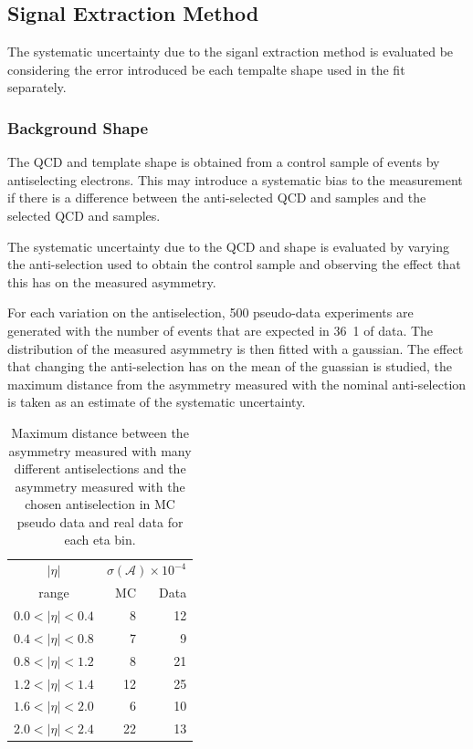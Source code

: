 \subsection{Signal Extraction Method}

The systematic uncertainty due to the siganl extraction method is evaluated be
considering the error introduced be each \ETm tempalte shape used in the fit
separately.

\subsubsection{Background \ETm Shape}

The \ac{QCD} and \gjet \ETm template shape is obtained from a control sample of
events by antiselecting electrons. This may introduce a systematic bias to the
measurement if there is a difference between the anti-selected \ac{QCD} and \gjet
\ETm samples and the selected \ac{QCD} and \gjet samples.

The systematic uncertainty due to the \ac{QCD} and \gjet \ETm shape is evaluated by
varying the anti-selection used to obtain the control sample and observing the
effect that this has on the measured asymmetry.

For each variation on the antiselection, 500 pseudo-data experiments are
generated with the number of events that are expected in \unit{36.1}{\invpb} of
data. The distribution of the measured asymmetry is then fitted with a
gaussian.
The effect that changing the anti-selection has on the mean of the guassian is
studied, the maximum distance from the asymmetry measured with the nominal
anti-selection is taken as an estimate of the systematic uncertainty.

\begin{table}[htbp]
\begin{center}
\begin{tabular}{crr}
    \toprule
$|\eta|$  &\multicolumn{2}{c}{ $\sigma(\mathcal{A}) \times 10^{-4}$}\\
   range      & MC & Data\\
\midrule
$0.0<|\eta|<0.4$ & 8 & 12\\
$0.4<|\eta|<0.8$ & 7 & 9\\
$0.8<|\eta|<1.2$ & 8 & 21\\
$1.2<|\eta|<1.4$ & 12& 25\\
$1.6<|\eta|<2.0$ & 6 & 10\\
$2.0<|\eta|<2.4$ & 22& 13\\
    \bottomrule
\end{tabular}
\caption{Maximum distance between the asymmetry measured with many different antiselections
and the asymmetry measured with the chosen antiselection in MC pseudo data and real data for each eta bin.}
\label{tab:systQCD}
\end{center}
\end{table}


